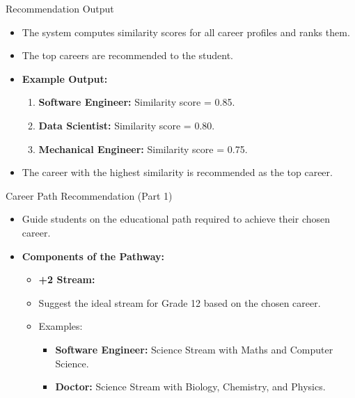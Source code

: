 \documentclass{beamer}
\begin{document}
\begin{frame}{Recommendation Output}
    \begin{itemize}
        \item The system computes similarity scores for all career profiles and ranks them.
        \item The top careers are recommended to the student.
        \item \textbf{Example Output:}
        \begin{enumerate}
            \item \textbf{Software Engineer:} Similarity score = 0.85.
            \item \textbf{Data Scientist:} Similarity score = 0.80.
            \item \textbf{Mechanical Engineer:} Similarity score = 0.75.
        \end{enumerate}
        \item The career with the highest similarity is recommended as the top career.
    \end{itemize}
\end{frame}

\begin{frame}{Career Path Recommendation (Part 1)}
    \begin{itemize}
        \item
        Guide students on the educational path required to achieve their chosen career.

        \item \textbf{Components of the Pathway:}
        \begin{itemize}
            \item \textbf{+2 Stream:}
            \item Suggest the ideal stream for Grade 12 based on the chosen career.
            \item Examples:
            \begin{itemize}
                \item \textbf{Software Engineer:} Science Stream with Maths and Computer Science.
                \item \textbf{Doctor:} Science Stream with Biology, Chemistry, and Physics.
            \end{itemize}
        \end{itemize}
    \end{itemize}
\end{frame}
\end{document}
